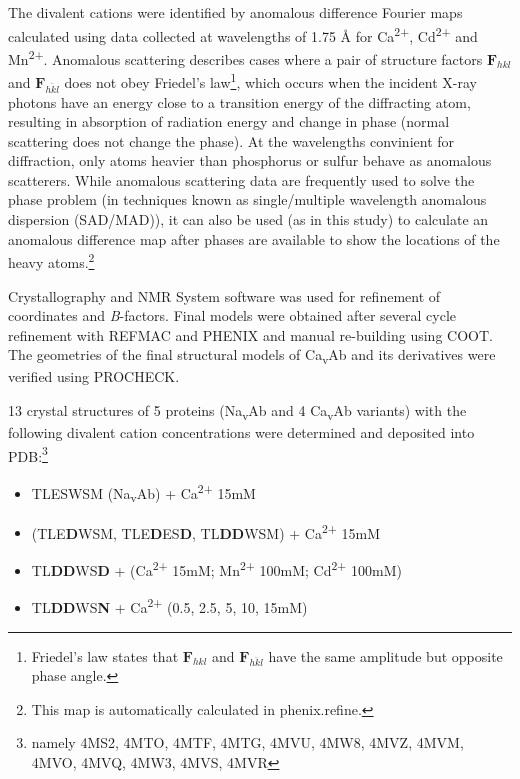 \documentclass[
]{article}
\providecommand{\tightlist}{%
  \setlength{\itemsep}{0pt}\setlength{\parskip}{0pt}}
\begin{document}
The divalent cations were identified by anomalous difference Fourier maps calculated using data collected at wavelengths of 1.75 Å for Ca\textsuperscript{2+}, Cd\textsuperscript{2+} and Mn\textsuperscript{2+}. Anomalous scattering describes cases where a pair of structure factors \(\mathbf{F}_{hkl}\) and \(\mathbf{F}_{\overline{hkl}}\) does not obey Friedel's law\footnote{Friedel's law states that \(\mathbf{F}_{hkl}\) and \(\mathbf{F}_{\overline{hkl}}\) have the same amplitude but opposite phase angle.}, which occurs when the incident X-ray photons have an energy close to a transition energy of the diffracting atom, resulting in absorption of radiation energy and change in phase (normal scattering does not change the phase). At the wavelengths convinient for diffraction, only atoms heavier than phosphorus or sulfur behave as anomalous scatterers. While anomalous scattering data are frequently used to solve the phase problem (in techniques known as single/multiple wavelength anomalous dispersion (SAD/MAD)), it can also be used (as in this study) to calculate an anomalous difference map after phases are available to show the locations of the heavy atoms.\footnote{This map is automatically calculated in phenix.refine.}

Crystallography and NMR System software was used for refinement of coordinates and \emph{B}-factors. Final models were obtained after several cycle refinement with REFMAC and PHENIX and manual re-building using COOT. The geometries of the final structural models of Ca\textsubscript{v}Ab and its derivatives were verified using PROCHECK.

13 crystal structures of 5 proteins (Na\textsubscript{v}Ab and 4 Ca\textsubscript{v}Ab variants) with the following divalent cation concentrations were determined and deposited into PDB:\footnote{namely 4MS2, 4MTO, 4MTF, 4MTG, 4MVU, 4MW8, 4MVZ, 4MVM, 4MVO, 4MVQ, 4MW3, 4MVS, 4MVR}

\begin{itemize}
\tightlist
\item
  TLESWSM (Na\textsubscript{v}Ab) + Ca\textsuperscript{2+} 15mM
\item
  (TLE\textbf{D}WSM, TLE\textbf{D}ES\textbf{D}, TL\textbf{DD}WSM) + Ca\textsuperscript{2+} 15mM
\item
  TL\textbf{DD}WS\textbf{D} + (Ca\textsuperscript{2+} 15mM; Mn\textsuperscript{2+} 100mM; Cd\textsuperscript{2+} 100mM)
\item
  TL\textbf{DD}WS\textbf{N} + Ca\textsuperscript{2+} (0.5, 2.5, 5, 10, 15mM)
\end{itemize}
\end{document}
